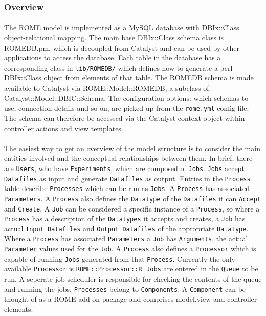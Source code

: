 \subsubsection{Overview}
\label{sec:model_overview}

\paragraph{}
The ROME model is implemented as a MySQL database with DBIx::Class object-relational mapping. The main base DBIx::Class schema class is ROMEDB.pm, which is decoupled from Catalyst and can be used by other applications to access the database.  Each table in the database has a corresponding class in \texttt{lib/ROMEDB/} which defines how to generate a perl DBIx::Class object from elements of that table. The ROMEDB schema is made available to Catalyst via ROME::Model::ROMEDB, a subclass of Catalyst::Model::DBIC::Schema. The configuration options: which schemas to use, connection details and so on, are picked up from the \texttt{rome.yml} config file. The schema can therefore be accessed via the Catalyst context object within controller actions and view templates. 

\paragraph{}
The easiest way to get an overview of the model structure is to consider the main entities involved and the conceptual relationships between them. In brief, there are \texttt{Users}, who have \texttt{Experiments}, which are composed of \texttt{Jobs}. \texttt{Jobs} accept \texttt{Datafiles} as input and generate \texttt{Datafiles} as output. Entries in the \texttt{Process} table describe \texttt{Processes} which can be run as \texttt{Jobs}. A \texttt{Process} has associated \texttt{Parameters}. A \texttt{Process} also defines the \texttt{Datatype} of the \texttt{Datafiles} it can \texttt{Accept} and \texttt{Create}. A \texttt{Job} can be considered a specific instance of a \texttt{Process}, so where a \texttt{Process} has a description of the \texttt{Datatypes} it accepts and creates, a \texttt{Job} has actual \texttt{Input Datafiles} and \texttt{Output Datafiles} of the appropriate \texttt{Datatype}. Where a \texttt{Process} has associated \texttt{Parameters} a \texttt{Job} has \texttt{Arguments}, the actual \texttt{Parameter} values used for the \texttt{Job}. A \texttt{Process} also defines a \texttt{Processor} which is capable of running \texttt{Jobs} generated from that \texttt{Process}. Currently the only available \texttt{Processor} is \texttt{ROME::Processor::R}. \texttt{Jobs} are entered in the \texttt{Queue} to be run. A seperate job scheduler is responsible for checking the contents of the queue and running the jobs. \texttt{Processes} belong to \texttt{Components}. A \texttt{Component} can be thought of as a ROME add-on package and comprises model,view and controller elements.

